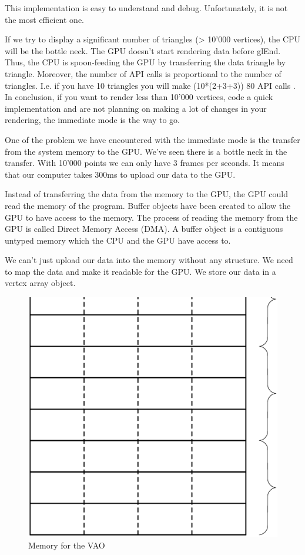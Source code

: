 This implementation is easy to understand and debug. Unfortunately, it is not the most efficient one. 

If we try to display a significant number of triangles (> 10'000 vertices), the CPU will be the bottle neck. The GPU doesn't start rendering data before glEnd. Thus, the CPU is spoon-feeding the GPU by transferring the data triangle by triangle. Moreover, the number of API calls is proportional to the number of triangles. I.e. if you have 10 triangles you will make (10*(2+3+3)) 80 API calls \cite{opengllegacy}. In conclusion, if you want to render less than 10'000 vertices, code a quick implementation and are not planning on making a lot of changes in your rendering, the immediate mode is the way to go.


One of the problem we have encountered with the immediate mode is the transfer from the system memory to the GPU.  We've seen there is a bottle neck in the transfer. With 10'000 points we can only have 3 frames per seconds. It means that our computer takes 300ms to upload our data to the GPU.

Instead of transferring the data from the memory to the GPU, the GPU could read the memory of the program. Buffer objects have been created to allow the GPU to have access to the memory. The process of reading the memory from the GPU is called Direct Memory Access (DMA). A buffer object is a contiguous untyped memory which the CPU and the GPU have access to.

We can't just upload our data into the memory without any structure. We need to map the data and make it readable for the GPU. We store our data in a vertex array object.

\begin{figure}[H]
  \centering
  \includegraphics[scale=0.2]{images/memory.eps}
    \caption{Memory for the VAO}
  \label{memoryVAO}
\end{figure}


